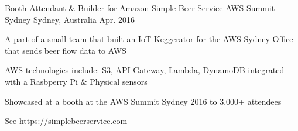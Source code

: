 \begin{cventries}
  \cventry
    {Booth Attendant \& Builder for Amazon Simple Beer Service} %
    {AWS Summit Sydney} %
    {Sydney, Australia} %
    {Apr. 2016} %
    {
      \begin{cvitems} %
        \item {A part of a small team that built an IoT Keggerator for the AWS Sydney Office that sends beer flow data to AWS}
        \item {AWS technologies include: S3, API Gateway, Lambda, DynamoDB integrated with a Rasbperry Pi \& Physical sensors}
        \item {Showcased at a booth at the AWS Summit Sydney 2016 to 3,000+ attendees}
        \item {See https://simplebeerservice.com}
      \end{cvitems}
    }
\end{cventries}
